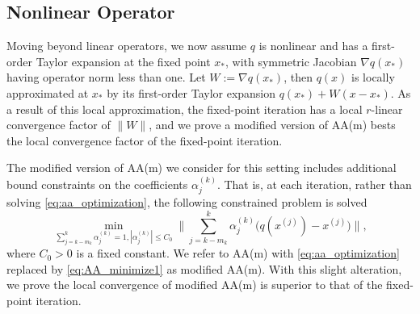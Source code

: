 \documentclass[11pt]{article}
\begin{document}
\subsection{Nonlinear Operator}\label{sec:nonlinear}
Moving beyond linear operators, we now assume $q$ is nonlinear and has a first-order Taylor expansion at the fixed point $x_*$, with symmetric Jacobian $\nabla q(x_*)$ having operator norm less than one. 
Let $W:=\nabla q(x_*)$, then $q(x)$ is locally approximated at $x_*$ by its first-order Taylor expansion $q(x_*)+W(x-x_*)$. 
As a result of this local approximation, the fixed-point iteration has a local $r$-linear convergence factor of $\|W\|$, and 
 we prove a modified version of AA(m) bests the local convergence factor of the fixed-point iteration.

The modified version of AA(m) we consider for this setting includes   additional bound constraints on the coefficients $\alpha_j^{(k)}$. That is, at each iteration, rather than solving \eqref{eq:aa_optimization},
the following constrained problem is solved
\begin{equation}\label{eq:AA_minimize1}
\min_{\sum_{j=k-m_k}^{k} \alpha_j^{(k)}=1, |\alpha_j^{(k)}|\leq C_0}\Big\|\sum_{j=k-m_k}^{k}\alpha_j^{(k)}\big(q(x^{(j)})-x^{(j)}\big)\Big\|,
\end{equation}
where $C_0 >0$ is a fixed constant. We refer to AA(m) with \eqref{eq:aa_optimization} replaced by \eqref{eq:AA_minimize1} as modified AA(m). 
With this slight alteration, we  
prove the local convergence of modified AA(m) is superior to that of the fixed-point iteration.
\end{document}
